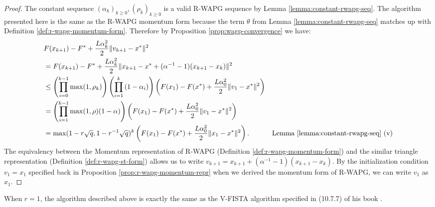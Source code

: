 \documentclass[12pt]{article}
\begin{document}
    \begin{proof}
        The constant sequence $(\alpha_k)_{k \ge 0}, (\rho_k)_{k \ge 0}$ is a valid R-WAPG sequence by Lemma \ref{lemma:constant-rwapg-seq}. 
        The algorithm presented here is the same as the R-WAPG momentum form because the term $\theta$ from Lemma \ref{lemma:constant-rwapg-seq} matches up with Definition \ref{def:r-wapg-momentum-form}. 
        Therefore by Proposition \ref{prop:wagp-convergence} we have: 
        \begin{align*}
            & F(x_{k + 1}) - F^* + \frac{L\alpha_k^2}{2}\Vert v_{k + 1} - x^*\Vert^2
            \\
            &= 
            F(x_{k + 1}) - F^* + \frac{L\alpha_k^2}{2}\Vert x_{k + 1}  - x^* + (\alpha^{-1} - 1)(x_{k + 1} - x_k)\Vert^2
            \\
            &\le 
            \left(
                \prod_{i = 0}^{k - 1} \max(1, \rho_{k})
            \right)
            \left(
                \prod_{i = 1}^{k} \left(1  - \alpha_i\right)
            \right)
            \left(
                F(x_1) - F(x^*) + \frac{L\alpha_0^2}{2}\Vert v_1 - x^*\Vert^2
            \right)
            \\
            &= \left(
                \prod_{i = 1}^{k - 1} \max(1, \rho)(1 - \alpha)
            \right)
            \left(
                F(x_1) - F(x^*) + \frac{L\alpha_0^2}{2}\Vert v_1 - x^*\Vert^2
            \right)
            \\
            &= \max(1 - r\sqrt{q}, 1 - r^{-1}\sqrt{q})^k
            \left(
                F(x_1) - F(x^*) + \frac{L\alpha_0^2}{2}\Vert x_1 - x^*\Vert^2
            \right). 
            & \text{Lemma \ref{lemma:constant-rwapg-seq} (v)}
        \end{align*}
        The equivalency between the Momentum representation of R-WAPG (Definition \ref{def:r-wapg-momentum-form}) and the similar triangle representation (Definition \ref{def:r-wapg-st-form}) allows us to write $v_{k + 1} = x_{k + 1} + (\alpha^{-1} - 1)(x_{k + 1} - x_k)$. 
        By the initialization condition $v_1 = x_1$ specified back in Proposition \ref{prop:r-wapg-momentum-repr} when we derived the momentum form of R-WAPG, we can write $v_1$ as $x_1$. 
        
    \end{proof}
    \begin{remark}
        When $r = 1$, the algorithm described above is exactly the same as the V-FISTA algorithm specified in (10.7.7) of his book \cite{beck_first-order_2017}. 
    \end{remark}
\end{document}
